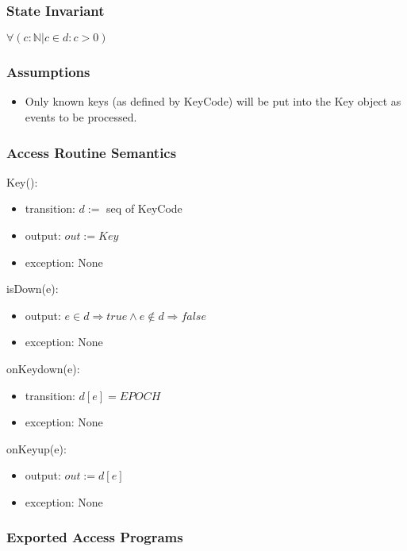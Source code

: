 \documentclass[12pt]{article}
\begin{document}
\subsubsection*{State Invariant}

$\forall (c : \mathbb{N} | c \in d : c \gt 0)$

\subsubsection*{Assumptions}

\begin{itemize}
    \item Only known keys (as defined by KeyCode) will be put into the Key object as events to be processed.
\end{itemize}

\subsubsection*{Access Routine Semantics}

Key():
\begin{itemize}
    \item transition: $d :=$ seq of KeyCode
    \item output: $out := Key$
    \item exception: None
\end{itemize}

\noindent isDown(e):
\begin{itemize}
    \item output: $e \in d \Rightarrow true \land e \notin d \Rightarrow false$
    \item exception: None
\end{itemize}

\noindent onKeydown(e):
\begin{itemize}
    \item transition: $d[e] = EPOCH$
    \item exception: None
\end{itemize}

\noindent onKeyup(e):
\begin{itemize}
    \item output: $out := d[e]$
    \item exception: None
\end{itemize}


\newpage %

\subsubsection*{Exported Access Programs}
\end{document}
